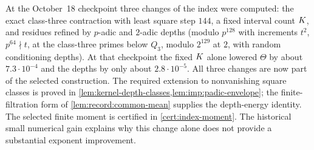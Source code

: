 \begin{remark}\label{rem:record:item13}
At the October~18 checkpoint three changes of the index were computed: the exact
class-three contraction with least square step $144$, a fixed interval count
$K$, and residues refined by $p$-adic and $2$-adic depths (modulo $p^{128}$
with increments $t^2$, $p^{64}\nmid t$, at the class-three primes below $Q_3$,
modulo $2^{129}$ at $2$, with random conditioning depths). At that checkpoint the
fixed $K$ alone lowered $\Theta$ by about $7.3\cdot10^{-4}$ and the depths by only about $2.8\cdot10^{-5}$. All three changes are now part of the selected construction. The required
extension to nonvanishing square classes is proved in
\cref{lem:kernel-depth-classes,lem:imp:padic-envelope}; the finite-filtration
form of \cref{lem:record:common-mean} supplies the depth-energy identity.
The selected finite moment is certified in \cref{cert:index-moment}.
The historical small numerical gain explains why this change alone does not
provide a substantial exponent improvement.
\end{remark}

